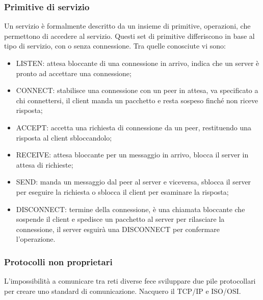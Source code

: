 \documentclass{subfiles}
\begin{document}
\subsubsection{Primitive di servizio}
    Un servizio è formalmente descritto da un insieme di primitive, operazioni, che permettono di accedere al servizio. Questi set di 
    primitive differiscono in base al tipo di servizio, con o senza connessione.
    Tra quelle conosciute vi sono:
    \begin{itemize}
        \item LISTEN: attesa bloccante di una connessione in arrivo, indica che un server è pronto ad accettare una connessione;
        \item CONNECT: stabilisce una connessione con un peer in attesa, va specificato a chi connettersi, il client manda un pacchetto 
        e resta sospeso finché non riceve risposta;
        \item ACCEPT: accetta una richiesta di connessione da un peer, restituendo una risposta al client sbloccandolo;
        \item RECEIVE: attesa bloccante per un messaggio in arrivo, blocca il server in attesa di richieste;
        \item SEND: manda un messaggio dal peer al server e viceversa, sblocca il server per eseguire la richiesta o sblocca il client 
        per esaminare la risposta;
        \item DISCONNECT: termine della connessione, è una chiamata bloccante che sospende il client e spedisce un pacchetto al server 
        per rilasciare la connessione, il server esguirà una DISCONNECT per confermare l'operazione.
    \end{itemize}
\clearpage
    
\subsubsection{Protocolli non proprietari}
    L'impossibilità a comunicare tra reti diverse fece sviluppare due pile protocollari per creare uno standard di comunicazione. 
    Nacquero il TCP/IP e ISO/OSI.
\end{document}

